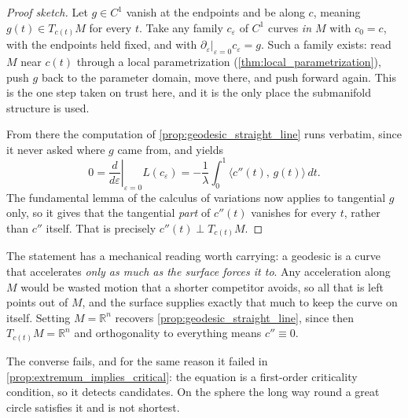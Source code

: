 \begin{proof}[Proof sketch]
Let $g \in C^1$ vanish at the endpoints and be  along $c$, meaning
$g(t) \in T_{c(t)}M$ for every $t$. Take any family $c_\varepsilon$ of $C^1$ curves \emph{in $M$}
with $c_0 = c$, with the endpoints held fixed, and with
$\partial_\varepsilon\big|_{\varepsilon=0}c_\varepsilon = g$. Such a family exists: read $M$ near
$c(t)$ through a local parametrization (\cref{thm:local_parametrization}), push $g$ back to the
parameter domain, move there, and push forward again. This is the one step taken on trust here,
and it is the only place the submanifold structure is used.

From there the computation of \cref{prop:geodesic_straight_line} runs verbatim, since it never
asked where $g$ came from, and yields
\[0 = \left.\frac{d}{d\varepsilon}\right|_{\varepsilon=0}L(c_\varepsilon)
    = -\frac1\lambda\int_0^1 \big\langle c''(t),\,g(t)\big\rangle\,dt.\]
The fundamental lemma of the calculus of variations now applies to tangential $g$ only, so it
gives that the tangential \emph{part} of $c''(t)$ vanishes for every $t$, rather than $c''$
itself. That is precisely $c''(t) \perp T_{c(t)}M$.
\end{proof}

\begin{remark}
The statement has a mechanical reading worth carrying: a geodesic is a curve that accelerates
\emph{only as much as the surface forces it to}. Any acceleration along $M$ would be wasted
motion that a shorter competitor avoids, so all that is left points out of $M$, and the surface
supplies exactly that much to keep the curve on itself. Setting $M = \mathbb{R}^n$ recovers
\cref{prop:geodesic_straight_line}, since then $T_{c(t)}M = \mathbb{R}^n$ and orthogonality to
everything means $c'' \equiv 0$.

The converse fails, and for the same reason it failed in \cref{prop:extremum_implies_critical}:
the equation is a first-order criticality condition, so it detects candidates. On the sphere the
long way round a great circle satisfies it and is not shortest.
\end{remark}

